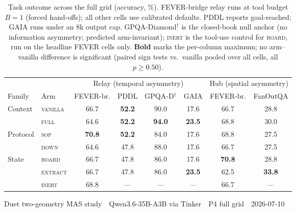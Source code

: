 \documentclass[11pt]{article}
\begin{document}
\begin{table}[t]
\centering
\caption{Task outcome across the full grid (accuracy, \%). FEVER-bridge relay runs at
tool budget $B{=}1$ (forced hand-offs); all other cells use calibrated defaults. PDDL
reports goal-reached; GAIA runs under an 8k output cap. GPQA-Diamond$^\dagger$ is the
closed-book null anchor (no information asymmetry; predicted arm-invariant);
\textsc{inert} is the tool-use control for \textsc{board}, run on the headline FEVER
cells only. \textbf{Bold} marks the per-column maximum; no arm--vanilla difference is
significant (paired sign tests vs.\ vanilla pooled over all cells, all $p \ge 0.50$).}
\vspace{0.6em}
\begin{tabular}{llcccccc}
\toprule
 & & \multicolumn{4}{c}{Relay (temporal asymmetry)} & \multicolumn{2}{c}{Hub (spatial asymmetry)} \\
\cmidrule(lr){3-6}\cmidrule(lr){7-8}
Family & Arm & FEVER-br. & PDDL & GPQA-D$^\dagger$ & GAIA & FEVER-br. & FanOutQA \\
\midrule
Context  & \textsc{vanilla} & 66.7 & \textbf{52.2} & 90.0 & 17.6 & 66.7 & 28.8 \\
         & \textsc{full}    & 64.6 & \textbf{52.2} & \textbf{94.0} & \textbf{23.5} & 68.8 & 30.0 \\
\addlinespace
Protocol & \textsc{sop}     & \textbf{70.8} & \textbf{52.2} & 84.0 & 17.6 & 68.8 & 27.5 \\
         & \textsc{down}    & 64.6 & 47.8 & 88.0 & 17.6 & 66.7 & 27.5 \\
\addlinespace
State    & \textsc{board}   & 66.7 & 47.8 & 86.0 & 17.6 & \textbf{70.8} & 28.8 \\
         & \textsc{extract} & 66.7 & 47.8 & 86.0 & \textbf{23.5} & 62.5 & \textbf{33.8} \\
         & \textsc{inert}   & 68.8 & --- & --- & --- & 66.7 & --- \\
\bottomrule
\end{tabular}

\vspace{0.9em}
{\small Duet two-geometry MAS study \,\textperiodcentered\, Qwen3.6-35B-A3B via Tinker
\,\textperiodcentered\, P4 full grid \,\textperiodcentered\, 2026-07-10}
\end{table}
\end{document}
